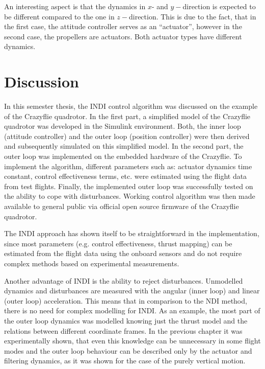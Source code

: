 \documentclass[11pt, a4paper, twoside]{report}
\begin{document}
An interesting aspect is that the dynamics in $x$- and $y-$direction is expected to be different compared to the one in $z-$direction. This is due to the fact, that in the first case, the attitude controller serves as an ``actuator'', however in the second case, the propellers are actuators. Both actuator types have different dynamics. 




\chapter{Discussion} \label{cha:discussion}

In this semester thesis, the \acrfull{INDI} control algorithm was discussed on the example of the Crazyflie quadrotor. In the first part, a simplified model of the Crazyflie quadrotor was developed in the Simulink environment. Both, the inner loop (attitude controller) and the outer loop (position controller) were then derived and subsequently simulated on this simplified model. In the second part, the outer loop was implemented on the embedded hardware of the Crazyflie. To implement the algorithm, different parameters such as: actuator dynamics time constant, control effectiveness terms, etc. were estimated using the flight data from test flights. Finally, the implemented outer loop was successfully tested on the ability to cope with disturbances. Working control algorithm was then made available to general public via official open source firmware of the Crazyflie quadrotor.

The \acrshort{INDI} approach has shown itself to be straightforward in the implementation, since most parameters (e.g. control effectiveness, thrust mapping) can be estimated from the flight data using the onboard sensors and do not require complex methods based on experimental measurements. 

Another advantage of \acrshort{INDI} is the ability to reject disturbances. Unmodelled dynamics and disturbances are measured with the angular (inner loop) and linear (outer loop) acceleration. This means that in comparison to the \acrfull{NDI} method, there is no need for complex modelling for \acrshort{INDI}. As an example, the most part of the outer loop dynamics was modelled knowing just the thrust model and the relations between different coordinate frames. In the previous chapter it was experimentally shown, that even this knowledge can be unnecessary in some flight modes and the outer loop behaviour can be described only by the actuator and filtering dynamics, as it was shown for the case of the purely vertical motion.
\end{document}

